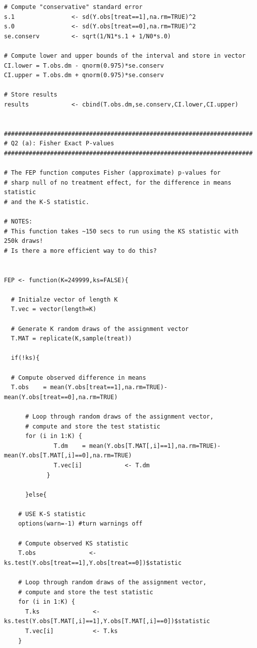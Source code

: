 \documentclass[12pt]{article}
\begin{document}
\begin{verbatim}
# Compute "conservative" standard error
s.1                <- sd(Y.obs[treat==1],na.rm=TRUE)^2
s.0                <- sd(Y.obs[treat==0],na.rm=TRUE)^2
se.conserv         <- sqrt(1/N1*s.1 + 1/N0*s.0)

# Compute lower and upper bounds of the interval and store in vector
CI.lower = T.obs.dm - qnorm(0.975)*se.conserv
CI.upper = T.obs.dm + qnorm(0.975)*se.conserv

# Store results
results            <- cbind(T.obs.dm,se.conserv,CI.lower,CI.upper)


######################################################################
# Q2 (a): Fisher Exact P-values
######################################################################

# The FEP function computes Fisher (approximate) p-values for 
# sharp null of no treatment effect, for the difference in means statistic
# and the K-S statistic.

# NOTES: 
# This function takes ~150 secs to run using the KS statistic with 250k draws!
# Is there a more efficient way to do this?


FEP <- function(K=249999,ks=FALSE){
  
  # Initialze vector of length K
  T.vec = vector(length=K)
  
  # Generate K random draws of the assignment vector
  T.MAT = replicate(K,sample(treat))
  
  if(!ks){
  
  # Compute observed difference in means
  T.obs    = mean(Y.obs[treat==1],na.rm=TRUE)-mean(Y.obs[treat==0],na.rm=TRUE)
  
      # Loop through random draws of the assignment vector, 
      # compute and store the test statistic
      for (i in 1:K) {
              T.dm    = mean(Y.obs[T.MAT[,i]==1],na.rm=TRUE)-mean(Y.obs[T.MAT[,i]==0],na.rm=TRUE)
              T.vec[i]            <- T.dm
            }
  
      }else{
    
    # USE K-S statistic
    options(warn=-1) #turn warnings off
    
    # Compute observed KS statistic
    T.obs               <- ks.test(Y.obs[treat==1],Y.obs[treat==0])$statistic
    
    # Loop through random draws of the assignment vector, 
    # compute and store the test statistic
    for (i in 1:K) {
      T.ks               <- ks.test(Y.obs[T.MAT[,i]==1],Y.obs[T.MAT[,i]==0])$statistic
      T.vec[i]           <- T.ks
    }
    

\end{verbatim}
\end{document}
